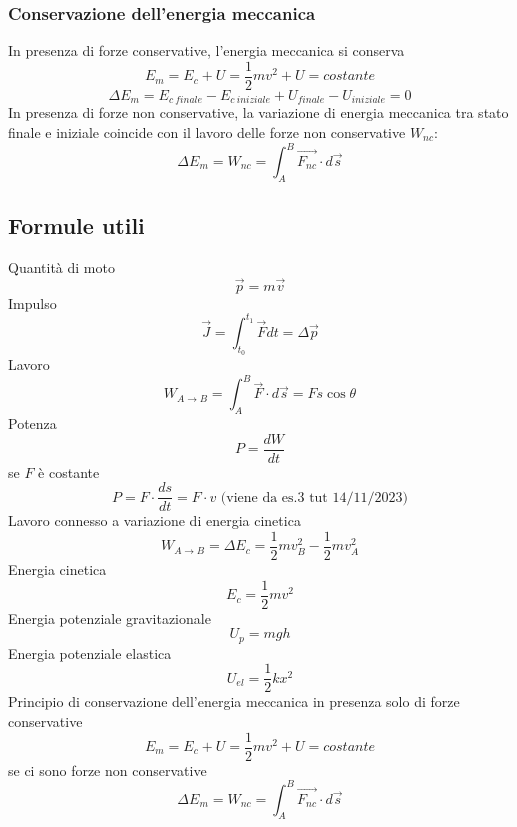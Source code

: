\documentclass[twoside]{article}
\begin{document}
\subsubsection{Conservazione dell'energia meccanica}
In presenza di forze conservative, l’energia meccanica si conserva
\begin{equation}
  \boxed{E_m = E_c + U = \frac{1}{2} m v^2 + U = costante}
\end{equation}
\begin{equation*}
  \Delta E_m = E_{c\ finale} - E_{c\ iniziale} + U_{finale} - U_{iniziale} = 0
\end{equation*}
In presenza di forze non conservative, la variazione di energia meccanica tra
stato finale e iniziale coincide con il lavoro delle forze non conservative $W_{nc}$:
\begin{equation}
  \boxed{\Delta E_m = W_{nc} = \int_{A}^{B} \vec{F_{nc}} \cdot d\vec{s}}
\end{equation}
\subsection{Formule utili}
Quantità di moto
\begin{equation*}
  \boxed{\vec{p} = m\vec{v}}
\end{equation*}
Impulso
\begin{equation*}
  \boxed{\vec{J} = \int_{t_0}^{t_1} \vec{F}dt = \Delta \vec{p}}
\end{equation*}
Lavoro
\begin{equation*}
  \boxed{W_{A \rightarrow B} = \int_{A}^{B} \vec{F} \cdot d\vec{s} = F s \cos{\theta}}
\end{equation*}
Potenza
\begin{equation*}
  \boxed{P = \frac{dW}{dt}}
\end{equation*}
se $F$ è costante
\begin{equation*}
  \boxed{P = F \cdot \frac{ds}{dt} =  F \cdot v} \text{ (viene da es.3 tut 14/11/2023)}
\end{equation*}
Lavoro connesso a variazione di energia cinetica
\begin{equation*}
  \boxed{W_{A\rightarrow B} = \Delta E_c = \frac{1}{2} m v_B^2 - \frac{1}{2}  m v_A^2}
\end{equation*}
Energia cinetica
\begin{equation*}
  \boxed{E_c = \frac{1}{2} m v^2}
\end{equation*}
Energia potenziale gravitazionale
\begin{equation*}
  \boxed{U_p = m g  h}
\end{equation*}
Energia potenziale elastica
\begin{equation*}
  \boxed{U_{el} = \frac{1}{2}  k  x^2}
\end{equation*}
Principio di conservazione dell’energia meccanica in presenza solo di forze conservative
\begin{equation*}
  \boxed{E_m = E_c + U = \frac{1}{2} m v^2 + U = costante}
\end{equation*}
se ci sono forze non conservative
\begin{equation*}
  \boxed{\Delta E_m = W_{nc} = \int_{A}^{B} \vec{F_{nc}} \cdot d\vec{s}}
\end{equation*}
\end{document}
